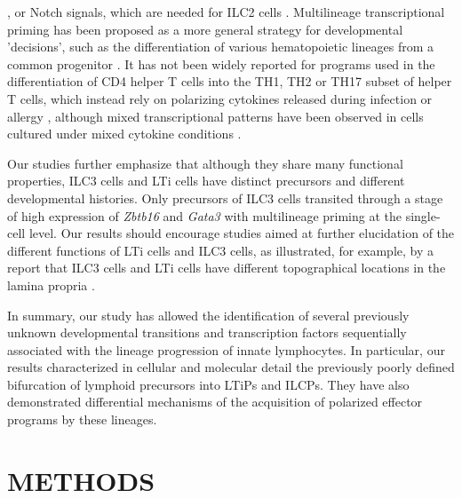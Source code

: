 \cite{van2014,spencer2014}, or Notch signals, which are needed for ILC2 cells \cite{yang2013,neill2010}. Multilineage transcriptional priming has been proposed as a more general strategy for developmental 'decisions', such as the differentiation of various hematopoietic lineages from a common progenitor \cite{laslo2006,hu1997,miyamoto2002,Ng2009}. It has not been widely reported for programs used in the differentiation of CD4\UP{} helper T cells into the TH1, TH2 or TH17 subset of helper T cells, which instead rely on polarizing cytokines released during infection or allergy \cite{zhu2010}, although mixed transcriptional patterns have been observed in cells cultured under mixed cytokine conditions \cite{antebi2013}.

Our studies further emphasize that although they share many functional properties, ILC3 cells and LTi cells have distinct precursors and different developmental histories. Only precursors of ILC3 cells transited through a stage of high expression of \textit{Zbtb16} and \textit{Gata3} with multilineage priming at the single-cell level. Our results should encourage studies aimed at further elucidation of the different functions of LTi cells and ILC3 cells, as illustrated, for example, by a report that ILC3 cells and LTi cells have different topographical locations in the lamina propria \cite{satoh2014}.

In summary, our study has allowed the identification of several previously unknown developmental transitions and transcription factors sequentially associated with the lineage progression of innate lymphocytes. In particular, our results characterized in cellular and molecular detail the previously poorly defined bifurcation of lymphoid precursors into LTiPs and ILCPs. They have also demonstrated differential mechanisms of the acquisition of polarized effector programs by these lineages.


\section{METHODS}


